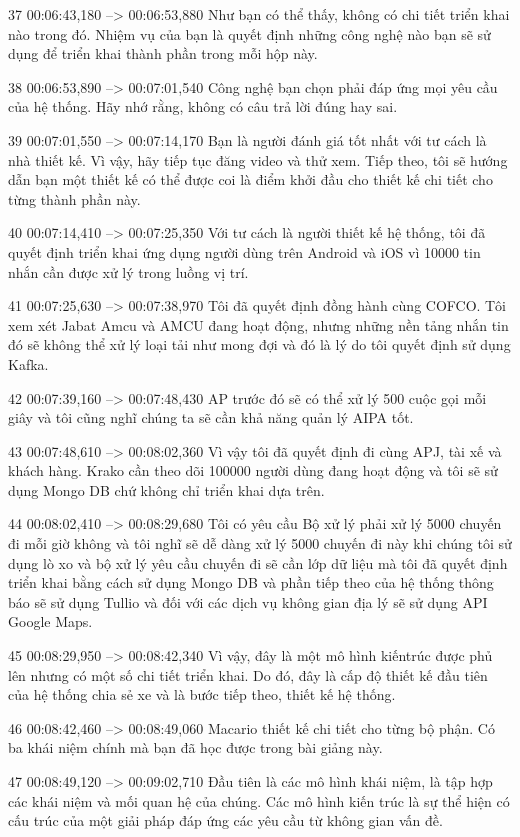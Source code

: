 37
00:06:43,180 --> 00:06:53,880
Như bạn có thể thấy, không có chi tiết triển khai nào trong đó.  Nhiệm vụ của bạn là quyết định những công nghệ nào bạn sẽ sử dụng để triển khai thành phần trong mỗi hộp này.

38
00:06:53,890 --> 00:07:01,540
Công nghệ bạn chọn phải đáp ứng mọi yêu cầu của hệ thống.  Hãy nhớ rằng, không có câu trả lời đúng hay sai.

39
00:07:01,550 --> 00:07:14,170
Bạn là người đánh giá tốt nhất với tư cách là nhà thiết kế.  Vì vậy, hãy tiếp tục đăng video và thử xem.  Tiếp theo, tôi sẽ hướng dẫn bạn một thiết kế có thể được coi là điểm khởi đầu cho thiết kế chi tiết cho từng thành phần này.

40
00:07:14,410 --> 00:07:25,350
Với tư cách là người thiết kế hệ thống, tôi đã quyết định triển khai ứng dụng người dùng trên Android và iOS vì 10000 tin nhắn cần được xử lý trong luồng vị trí.

41
00:07:25,630 --> 00:07:38,970
Tôi đã quyết định đồng hành cùng COFCO.  Tôi xem xét Jabat Amcu và AMCU đang hoạt động, nhưng những nền tảng nhắn tin đó sẽ không thể xử lý loại tải như mong đợi và đó là lý do tôi quyết định sử dụng Kafka.

42
00:07:39,160 --> 00:07:48,430
AP trước đó sẽ có thể xử lý 500 cuộc gọi mỗi giây và tôi cũng nghĩ chúng ta sẽ cần khả năng quản lý AIPA tốt.

43
00:07:48,610 --> 00:08:02,360
Vì vậy tôi đã quyết định đi cùng APJ, tài xế và khách hàng.  Krako cần theo dõi 100000 người dùng đang hoạt động và tôi sẽ sử dụng Mongo DB chứ không chỉ triển khai dựa trên.

44
00:08:02,410 --> 00:08:29,680
Tôi có yêu cầu Bộ xử lý phải xử lý 5000 chuyến đi mỗi giờ không và tôi nghĩ sẽ dễ dàng xử lý 5000 chuyến đi này khi chúng tôi sử dụng lò xo và bộ xử lý yêu cầu chuyến đi sẽ cần lớp dữ liệu mà tôi đã quyết định triển khai bằng cách sử dụng  Mongo DB và phần tiếp theo của hệ thống thông báo sẽ sử dụng Tullio và đối với các dịch vụ không gian địa lý sẽ sử dụng API Google Maps.

45
00:08:29,950 --> 00:08:42,340
Vì vậy, đây là một mô hình kiến ​​trúc được phủ lên nhưng có một số chi tiết triển khai.  Do đó, đây là cấp độ thiết kế đầu tiên của hệ thống chia sẻ xe và là bước tiếp theo, thiết kế hệ thống.

46
00:08:42,460 --> 00:08:49,060
Macario thiết kế chi tiết cho từng bộ phận.  Có ba khái niệm chính mà bạn đã học được trong bài giảng này.

47
00:08:49,120 --> 00:09:02,710
Đầu tiên là các mô hình khái niệm, là tập hợp các khái niệm và mối quan hệ của chúng.  Các mô hình kiến ​​trúc là sự thể hiện có cấu trúc của một giải pháp đáp ứng các yêu cầu từ không gian vấn đề.

